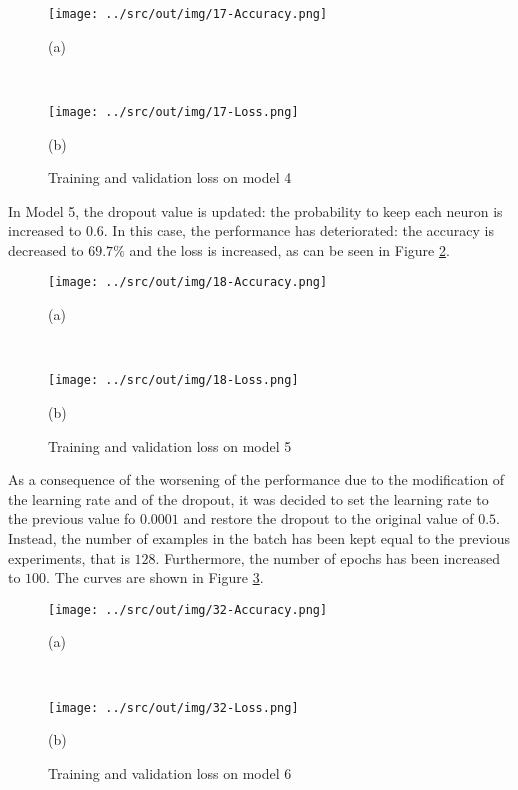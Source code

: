 \documentclass[a4paper,12pt]{article} %
\begin{document}
	\begin{figure}[H]
		\begin{minipage}[c]{.49\textwidth}
			\centering
			\texttt{[image: ../src/out/img/17-Accuracy.png]}
			\caption*{(a)}
		\end{minipage}
		~
		\begin{minipage}[c]{.49\textwidth}
			\centering
			\texttt{[image: ../src/out/img/17-Loss.png]}
			\caption*{(b)}
		\end{minipage}
		\caption{Training and validation loss on model 4}
		\label{fig:model4-performance}
	\end{figure}
	
	In Model 5, the dropout value is updated: the probability to keep each 
	neuron is increased to $0.6$.
	In this case, the performance has deteriorated: the accuracy is decreased 
	to $69.7\%$ and the loss is increased, as can be seen in Figure 
	\ref*{fig:model5-performance}.
	
	\begin{figure}[H]
		\begin{minipage}[c]{.49\textwidth}
			\centering
			\texttt{[image: ../src/out/img/18-Accuracy.png]}
			\caption*{(a)}
		\end{minipage}
		~
		\begin{minipage}[c]{.49\textwidth}
			\centering
			\texttt{[image: ../src/out/img/18-Loss.png]}
			\caption*{(b)}
		\end{minipage}
		\caption{Training and validation loss on model 5}
		\label{fig:model5-performance}
	\end{figure}
	
	As a consequence of the worsening of the performance due to the 
	modification of the learning rate and of the dropout, it was decided to set 
	the learning rate to the previous value fo $0.0001$ and restore the dropout 
	to the original value of $0.5$. Instead, the number of examples in the batch
	has been kept equal to the previous experiments, that is $128$. 
	Furthermore, the number of epochs has been increased to $100$.
	The curves are shown in Figure \ref{fig:model6-performance}.
		
	\begin{figure}[H]
		\begin{minipage}[c]{.49\textwidth}
			\centering
			\texttt{[image: ../src/out/img/32-Accuracy.png]}
			\caption*{(a)}
		\end{minipage}
		~
		\begin{minipage}[c]{.49\textwidth}
			\centering
			\texttt{[image: ../src/out/img/32-Loss.png]}
			\caption*{(b)}
		\end{minipage}
		\caption{Training and validation loss on model 6}
		\label{fig:model6-performance}
	\end{figure}
\end{document}
